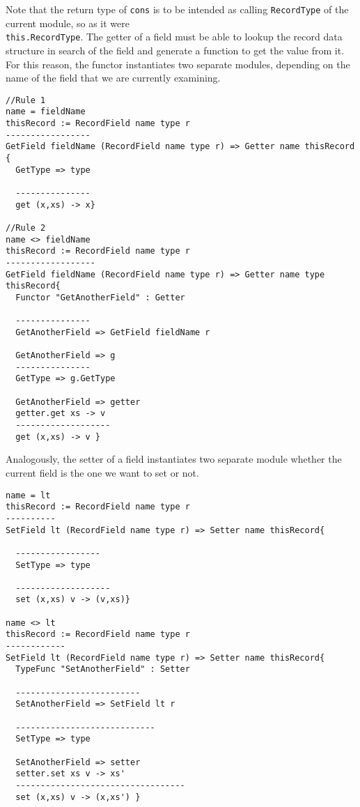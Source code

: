 \noindent
Note that the return type of \texttt{cons} is to be intended as calling \texttt{RecordType} of the current module, so as it were \\ \texttt{this.RecordType}.
The getter of a field must be able to lookup the record data structure in search of the field and generate a function to get the value from it. For this reason, the functor instantiates two separate modules, depending on the name of the field that we are currently examining.

\begin{lstlisting}[caption = Module instantiations for getters, label = code:getters]
//Rule 1
name = fieldName
thisRecord := RecordField name type r
-----------------
GetField fieldName (RecordField name type r) => Getter name thisRecord {
  GetType => type
  
  ---------------
  get (x,xs) -> x}

//Rule 2
name <> fieldName
thisRecord := RecordField name type r
------------------
GetField fieldName (RecordField name type r) => Getter name type thisRecord{
  Functor "GetAnotherField" : Getter
  
  ---------------
  GetAnotherField => GetField fieldName r
  
  GetAnotherField => g
  ---------------
  GetType => g.GetType
  
  GetAnotherField => getter
  getter.get xs -> v
  -------------------
  get (x,xs) -> v }
\end{lstlisting}

\noindent
Analogously, the setter of a field instantiates two separate module whether the current field is the one we want to set or not.

\begin{lstlisting}[caption = Module instantiations for setters, label = code:setters]
name = lt
thisRecord := RecordField name type r
----------
SetField lt (RecordField name type r) => Setter name thisRecord{
  
  -----------------
  SetType => type
  
  -------------------
  set (x,xs) v -> (v,xs)}

name <> lt
thisRecord := RecordField name type r
------------
SetField lt (RecordField name type r) => Setter name thisRecord{
  TypeFunc "SetAnotherField" : Setter
  
  -------------------------
  SetAnotherField => SetField lt r
  
  ----------------------------
  SetType => type
  
  SetAnotherField => setter
  setter.set xs v -> xs'
  ----------------------------------
  set (x,xs) v -> (x,xs') }
\end{lstlisting}

